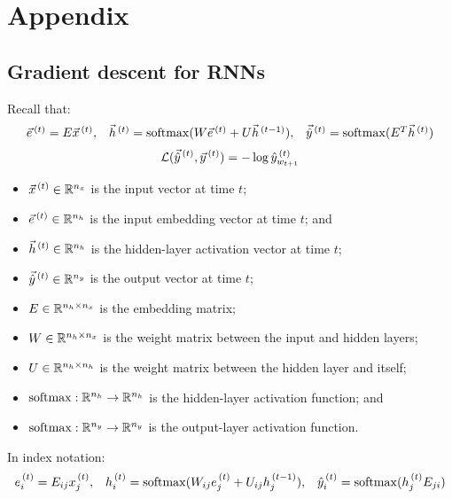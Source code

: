 \section*{Appendix}

\subsection*{Gradient descent for RNNs}

Recall that:
\[
  \begin{array}{lll}
    \vec{e}^{\,(t)} = E \vec{x}^{\,(t)}
    , &
    \vec{h}^{\,(t)} = \operatorname{softmax}(W \vec{e}^{\,(t)} + U \vec{h}^{\,(t - 1)})
    , &
    \vec{\hat{y}}^{\,(t)} = \operatorname{softmax}(E^T \vec{h}^{\,(t)})
  \end{array}
\]
$$
  \mathcal{L}(\vec{\hat{y}}^{\,(t)}, \vec{y}^{\,(t)})
  = -\log\hat{y}_{w_{t + 1}}^{\,(t)}
$$

\begin{itemize}
  \item $\vec{x}^{\,(t)} \in \mathbb{R}^{n_x}$ is the input vector at time $t$;
  \item $\vec{e}^{\,(t)} \in \mathbb{R}^{n_h}$ is the input embedding vector at time $t$; and
  \item $\vec{h}^{\,(t)} \in \mathbb{R}^{n_h}$ is the hidden-layer activation vector at time $t$;
  \item $\vec{\hat{y}}^{\,(t)} \in \mathbb{R}^{n_y}$ is the output vector at time $t$;
  \item $E \in \mathbb{R}^{n_h \times n_x}$ is the embedding matrix;
  \item $W \in \mathbb{R}^{n_h \times n_x}$ is the weight matrix between the input and hidden layers;
  \item $U \in \mathbb{R}^{n_h \times n_h}$ is the weight matrix between the hidden layer and itself;
  \item $\operatorname{softmax} : \mathbb{R}^{n_h} \to \mathbb{R}^{n_h}$ is the hidden-layer activation function; and
  \item $\operatorname{softmax} : \mathbb{R}^{n_y} \to \mathbb{R}^{n_y}$ is the output-layer activation function.
\end{itemize}

In index notation:
\[
  \begin{array}{lll}
    e_i^{\,(t)} = E_{ij} x_j^{\,(t)}
    , &
    h_i^{\,(t)} = \operatorname{softmax}(W_{ij} e_j^{\,(t)} + U_{ij} h_j^{\,(t - 1)})
    , &
    \hat{y}_i^{\,(t)} = \operatorname{softmax}(h_j^{\,(t)} E_{ji})
  \end{array}
\]

